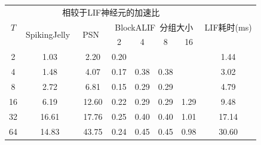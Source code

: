 \documentclass{SCIS2020cn}
\begin{document}
\begin{table}
\label{tab: cmp speedup}
\footnotesize
\tabcolsep 15pt %
\begin{tabular*}{\textwidth}{c|cccccc|c}
\hline
 \multicolumn{1}{c|}{\multirow{3}{*}{$T$}} & \multicolumn{6}{c|}{相较于LIF神经元的加速比}                                                                                     & \multirow{3}{*}{LIF耗时(ms)} \\ \cline{2-7}
    \multicolumn{1}{c|}{}                   & \multirow{2}{*}{SpikingJelly~\cite{doi:10.1126/sciadv.adi1480}} & \multicolumn{1}{c|}{\multirow{2}{*}{PSN~\cite{fang2023parallel}}} & \multicolumn{4}{c|}{BlockALIF~\cite{NEURIPS2023_b9f253c2}分组大小}           &                            \\
    \multicolumn{1}{c|}{}                   &                               & \multicolumn{1}{c|}{}                     & 2    & 4    & 8    & \multicolumn{1}{c|}{16} &                            \\ \hline
 2                                       & 1.03                          & 2.20                                      & 0.20 &      &      &                         & 1.44                       \\
    4                                       & 1.48                          & 4.07                                      & 0.17 & 0.38 & 0.38 &                         & 3.02                       \\
    8                                       & 2.72                          & 6.81                                      & 0.15 & 0.29 & 0.29 &                         & 4.79                       \\
    16                                      & 6.19                          & 12.60                                     & 0.22 & 0.29 & 0.29 & 1.29                    & 9.48                       \\
    32                                      & 16.61                         & 17.76                                     & 0.25 & 0.40 & 0.40 & 1.01                    & 17.14                      \\
    64                                      & 14.83                         & 43.75                                     & 0.24 & 0.45 & 0.45 & 0.98                    & 30.60                      \\ \hline
 \hline                 
\end{tabular*}
\end{table}
\end{document}
